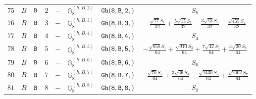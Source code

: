 \documentclass[fleqn,8pt]{jsarticle}
\begin{document}
\begin{table}[ht!]
\begin{center}
\begin{tabular}{cccccccc}
$ 75 $ & $ B $ & $ {\tt B} $ & $ 2 $ & $ - $ & $ \mathbb{G}_{8}^{(h,B,2)} $ & $ {\tt Gh(8,B,2,)} $ & $ S_{8} $ \\
$ 76 $ & $ B $ & $ {\tt B} $ & $ 3 $ & $ - $ & $ \mathbb{G}_{8}^{(h,B,3)} $ & $ {\tt Gh(8,B,3,)} $ & $ - \frac{\sqrt{77} S_{1}}{32} + \frac{5 \sqrt{15} S_{3}}{32} - \frac{3 \sqrt{13} S_{5}}{32} - \frac{\sqrt{455} S_{7}}{32} $ \\
$ 77 $ & $ B $ & $ {\tt B} $ & $ 4 $ & $ - $ & $ \mathbb{G}_{8}^{(h,B,4)} $ & $ {\tt Gh(8,B,4,)} $ & $ S_{4} $ \\
$ 78 $ & $ B $ & $ {\tt B} $ & $ 5 $ & $ - $ & $ \mathbb{G}_{8}^{(h,B,5)} $ & $ {\tt Gh(8,B,5,)} $ & $ - \frac{\sqrt{858} S_{1}}{64} + \frac{\sqrt{910} S_{3}}{64} + \frac{7 \sqrt{42} S_{5}}{64} + \frac{3 \sqrt{30} S_{7}}{64} $ \\
$ 79 $ & $ B $ & $ {\tt B} $ & $ 6 $ & $ - $ & $ \mathbb{G}_{8}^{(h,B,6)} $ & $ {\tt Gh(8,B,6,)} $ & $ S_{6} $ \\
$ 80 $ & $ B $ & $ {\tt B} $ & $ 7 $ & $ - $ & $ \mathbb{G}_{8}^{(h,B,7)} $ & $ {\tt Gh(8,B,7,)} $ & $ - \frac{\sqrt{70} S_{1}}{64} + \frac{3 \sqrt{66} S_{3}}{64} - \frac{\sqrt{1430} S_{5}}{64} + \frac{\sqrt{2002} S_{7}}{64} $ \\
$ 81 $ & $ B $ & $ {\tt B} $ & $ 8 $ & $ - $ & $ \mathbb{G}_{8}^{(h,B,8)} $ & $ {\tt Gh(8,B,8,)} $ & $ S_{2} $ \\
 \hline \hline
\end{tabular}
\end{center}
\end{table}
\end{document}
